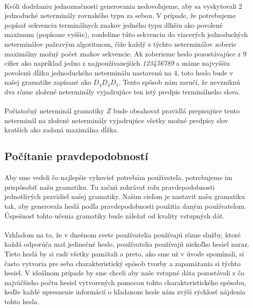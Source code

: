 \paragraph{}
Kvôli dodržaniu jednoznačnosti generovania nedovoľujeme, aby sa vyskytovali 2 jednoduché neterminály rovnakého typu za sebou. V prípade, že potrebujeme popísať sekvenciu terminálnych znakov jedného typu dlhšiu ako povolené maximum (popísane vyššie), rozdelíme túto sekvenciu do viacerých jednoduchých neterminálov pažravým algoritmom, čiže každý z týchto neterminálov zoberie maximálny možný počet znakov sekvencie. Ak zoberieme heslo pozostávajúce z 9 cifier ako napríklad jedno z najpoužívanejších \emph{123456789} a máme najvyššiu povolenú dĺžku jednoduchého neterminálu nastavenú na 4, toto heslo bude v našej gramatike zapísané ako \(D_4D_4D_1\). Tento spôsob nám zaručí, že nevzniknú dva rôzne zložené neterminály vyjadrujúce ten istý predpis terminálneho slova.

\paragraph{}
Počiatočný neterminál gramatiky \(Z\) bude obsahovať pravidlá prepisujúce tento neterminál na zložené neterminály vyjadrujúce všetky možné predpisy slov kratších ako zadaná maximálna dĺžka.

\subsection{Počítanie pravdepodobností}
\label{sec:Probability}
\paragraph{}
Aby sme vedeli čo najlepšie vyhovieť potrebám používateľa, potrebujeme im prispôsobiť našu gramatiku. Tu začnú zohrávať rolu pravdepodobnosti jednotlivých pravidiel našej gramatiky. Našim cieľom je nastaviť našu gramatiku tak, aby generovala heslá podľa pravdepodobnosti použitia daným používateľom. Úspešnosť tohto učenia gramatiky bude záležať od kvality vstupných dát.
\paragraph{}
Vzhľadom na to, že v dnešnom svete používatelia používajú rôzne služby, ktoré každá odporúča mať jedinečné heslo, používatelia používajú niekoľko hesiel naraz. Tieto heslá by si radi všetky pamätali a preto, ako sme už v úvode spomínali, si často vytvoria pre seba charakteristický spôsob tvorby a zapamätania si týchto hesiel. V ideálnom prípade by sme chceli aby naše vstupné dáta pozostávali z čo najväčšieho počtu hesiel vytvorených pomocou tohto charakteristického spôsobu, keďže každé upresnenie informácií o hľadanom hesle nám zvýši rýchlosť nájdenia tohto hesla.

